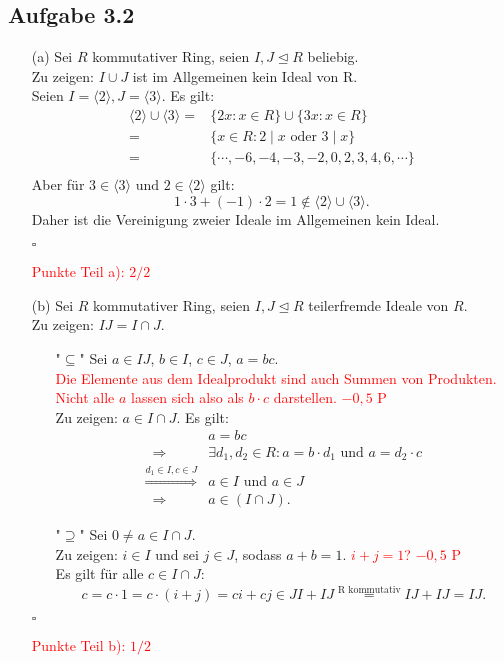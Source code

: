 \documentclass[12pt]{article}
\newcommand{\corr}[1]{\textcolor{red}{#1}}
\newcommand{\QED}{\begin{flushright} $\square$ \end{flushright}}
\newcommand{\df}{\enspace\Longrightarrow\enspace}
\newcommand{\isIdeal}{\trianglelefteq}
\newcommand{\ideal}[1]{\langle#1\rangle}
\begin{document}
\subsection*{Aufgabe 3.2}
\begin{enumerate}
	\item[(a)] Sei $R$ kommutativer Ring, seien $I,J\isIdeal R$ beliebig. \\
	Zu zeigen: $I\cup J$ ist im Allgemeinen kein Ideal von R. \\
	Seien $I=\ideal{2},J=\ideal{3}$. Es gilt:
	\begin{align*}
		\ideal{2}\cup\ideal{3}=&\{2x:x\in R\}\cup\{3x:x\in R\} \\
		= &\{x\in R:2\mid x\text{ oder }3\mid x\} \\
		= &\{\cdots,-6,-4,-3,-2,0,2,3,4,6,\cdots\} \\
	\end{align*}
	Aber für $3\in\ideal{3}\text{ und }2\in\ideal{2}$ gilt: \\
	$$1\cdot 3+(-1)\cdot 2=1\notin\ideal{2}\cup\ideal{3}.$$
	Daher ist die Vereinigung zweier Ideale im Allgemeinen kein Ideal.
	\QED
\corr{Punkte Teil a): $2/2$}
	
	\item[(b)] Sei $R$ kommutativer Ring, seien $I,J\isIdeal R$ teilerfremde Ideale von $R$. \\
	Zu zeigen: $IJ=I\cap J$.
	\begin{enumerate}
		\item["$\subseteq$"] Sei $a\in IJ$, $b\in I$, $c\in J$, $a=bc$. \\
\corr{Die Elemente aus dem Idealprodukt sind auch Summen von Produkten. Nicht alle $a$ lassen sich also als $b\cdot c$ darstellen. $-0,5$ P}\\
		Zu zeigen: $a\in I\cap J$. Es gilt:
		\begin{align*}
			&a=bc \\
			\df &\exists d_1,d_2\in R:a=b\cdot d_1\text{ und }a=d_2\cdot c \\
			\overset{d_1\in I,c\in J}{\df}&a\in I\text{ und }a\in J \\
			\df &a\in(I\cap J).
		\end{align*}
		
		\item["$\supseteq$"] Sei $0\neq a\in I\cap J$. \\
		Zu zeigen: $i\in I$ und sei $j\in J$, sodass $a+b=1$. \corr{$i+j=1$? $-0,5$ P}\\
 Es gilt für alle $c\in I\cap J$:
		$$c=c\cdot 1=c\cdot(i+j)=ci+cj\in JI+IJ\overset{\text{R kommutativ}}{=}IJ+IJ=IJ.$$
	\end{enumerate}
	\QED
\corr{Punkte Teil b): $1/2$}
	

\end{enumerate}
\end{document}
